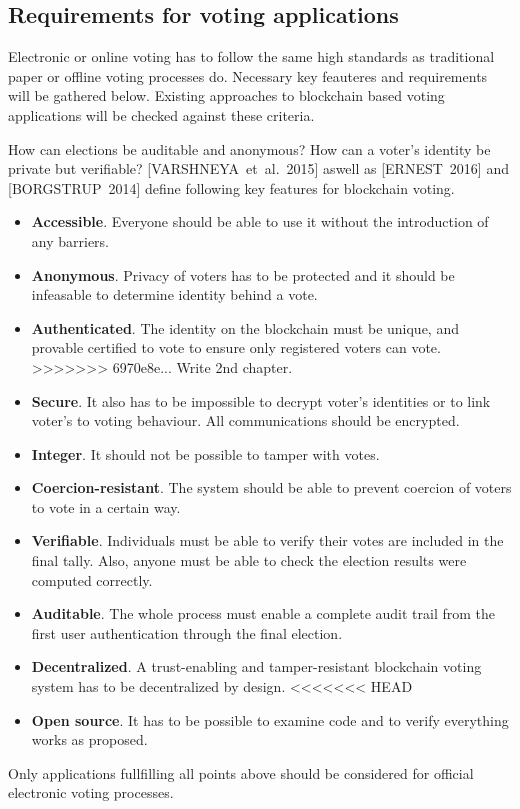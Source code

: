 \documentclass[9pt,oneside]{amsart}
\begin{document}
\begin{multicols}{2}
\begin{itemize}
\subsection{Requirements for voting applications}
Electronic or online voting has to follow the same high standards as traditional paper or offline voting processes do. Necessary key feauteres and requirements will be gathered below. Existing approaches to blockchain based voting applications will be checked against these criteria.\par
How can elections be auditable and anonymous? How can a voter's identity be private but verifiable? [VARSHNEYA~et~al.~2015] aswell as [ERNEST~2016] and [BORGSTRUP~2014] define following key features for blockchain voting.
\begin{itemize}
\item \textbf{Accessible}. Everyone should be able to use it without the introduction of any barriers.
\item \textbf{Anonymous}. Privacy of voters has to be protected and it should be infeasable to determine identity behind a vote.
\item \textbf{Authenticated}. The identity on the blockchain must be unique, and provable certified to vote to ensure only registered voters can vote.
>>>>>>> 6970e8e... Write 2nd chapter.
\item \textbf{Secure}. It also has to be impossible to decrypt voter's identities or to link voter's to voting behaviour. All communications should be encrypted.
\item \textbf{Integer}. It should not be possible to tamper with votes.
\item \textbf{Coercion-resistant}. The system should be able to prevent coercion of voters to vote in a certain way.
\item \textbf{Verifiable}. Individuals must be able to verify their votes are included in the final tally. Also, anyone must be able to check the election results were computed correctly.
\item \textbf{Auditable}. The whole process must enable a complete audit trail from the first user authentication through the final election.
\item \textbf{Decentralized}. A trust-enabling and tamper-resistant blockchain voting system has to be decentralized by design.
<<<<<<< HEAD
\item \textbf{Open source}. It has to be possible to examine code and to verify everything works as proposed.
\end{itemize}
Only applications fullfilling all points above should be considered for official electronic voting processes. %


\end{itemize}
\end{multicols}
\end{document}
